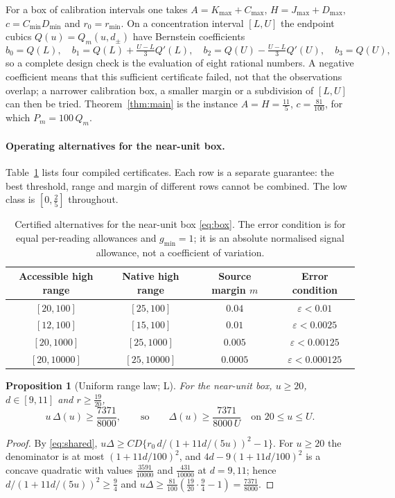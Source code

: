 \documentclass[11pt]{article}
\theoremstyle{plain}
\newtheorem{proposition}[theorem]{Proposition}
\theoremstyle{definition}
\numberwithin{equation}{section}
\newcommand{\eps}{\varepsilon}
\newcommand{\gmin}{g_{\min}}
\newcommand{\Lean}{\textsf{L}}   %
\begin{document}
For a box of calibration intervals one takes $A=K_{\max}+C_{\max}$,
$H=J_{\max}+D_{\max}$, $c=C_{\min}D_{\min}$ and $r_0=r_{\min}$. On a concentration
interval $[L,U]$ the endpoint cubics $Q(u)=Q_m(u,d_\pm)$ have Bernstein coefficients
\begin{equation}\label{eq:bernformula}
 b_0=Q(L),\quad b_1=Q(L)+\tfrac{U-L}3Q'(L),\quad
 b_2=Q(U)-\tfrac{U-L}3Q'(U),\quad b_3=Q(U),
\end{equation}
so a complete design check is the evaluation of eight rational numbers. A negative
coefficient means that this sufficient certificate failed, not that the
observations overlap; a narrower calibration box, a smaller margin or a subdivision
of $[L,U]$ can then be tried. Theorem~\ref{thm:main} is the instance $A=H=\frac{11}5$,
$c=\frac{81}{100}$, for which $P_m=100\,Q_m$.

\paragraph{Operating alternatives for the near-unit box.} Table~\ref{tab:ranges}
lists four compiled certificates. Each row is a separate guarantee: the best
threshold, range and margin of different rows cannot be combined. The low class is
$[0,\frac25]$ throughout.

\begin{table}[t]
\centering\small
\caption{Certified alternatives for the near-unit box \eqref{eq:box}. The error
condition is for equal per-reading allowances and $\gmin=1$; it is an absolute
normalised signal allowance, not a coefficient of variation.}
\label{tab:ranges}
\begin{tabular}{@{}cccc@{}}\toprule
Accessible high range & Native high range & Source margin $m$ & Error condition\\\midrule
$[20,100]$ & $[25,100]$ & $0.04$ & $\eps<0.01$\\
$[12,100]$ & $[15,100]$ & $0.01$ & $\eps<0.0025$\\
$[20,1000]$ & $[25,1000]$ & $0.005$ & $\eps<0.00125$\\
$[20,10000]$ & $[25,10000]$ & $0.0005$ & $\eps<0.000125$\\\bottomrule
\end{tabular}
\end{table}

\begin{proposition}[Uniform range law; \Lean]\label{prop:allU}
For the near-unit box, $u\ge20$, $d\in[9,11]$ and $r\ge\frac{19}{20}$,
\begin{equation}\label{eq:allU}
 u\,\Delta(u)\ge\frac{7371}{8000},\qquad\text{so}\qquad
 \Delta(u)\ge\frac{7371}{8000\,U}\quad\text{on }20\le u\le U .
\end{equation}
\end{proposition}
\begin{proof}
By \eqref{eq:shared}, $u\Delta\ge CD\{r_0\,d/(1+11d/(5u))^2-1\}$. For $u\ge20$ the
denominator is at most $(1+11d/100)^2$, and $4d-9(1+11d/100)^2$ is a concave
quadratic with values $\frac{3591}{10000}$ and $\frac{431}{10000}$ at $d=9,11$; hence
$d/(1+11d/(5u))^2\ge\frac94$ and
$u\Delta\ge\frac{81}{100}(\frac{19}{20}\cdot\frac94-1)=\frac{7371}{8000}$.
\end{proof}
\end{document}
